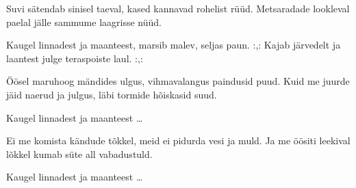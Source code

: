 Suvi s\"atendab sinisel taeval,
kased kannavad rohelist r\"u\"ud.
Metsaradade lookleval paelal
j\"alle sammume laagrisse n\"u\"ud.

Kaugel linnadest ja maanteest,
marsib malev, seljas paun.
:,: Kajab j\"arvedelt ja laantest
julge teraspoiste laul. :,:

\"O\"osel maruhoog m\"andides ulgus,
vihmavalangus paindusid puud.
Kuid me juurde j\"aid naerud ja julgus,
l\"abi tormide h\~oiskasid suud.

Kaugel linnadest ja maanteest \ldots

Ei me komista k\"andude t\~okkel,
meid ei pidurda vesi ja muld.
Ja me \"o\"ositi leekival l\~okkel
kumab s\"ute all vabadustuld.

Kaugel linnadest ja maanteest \ldots